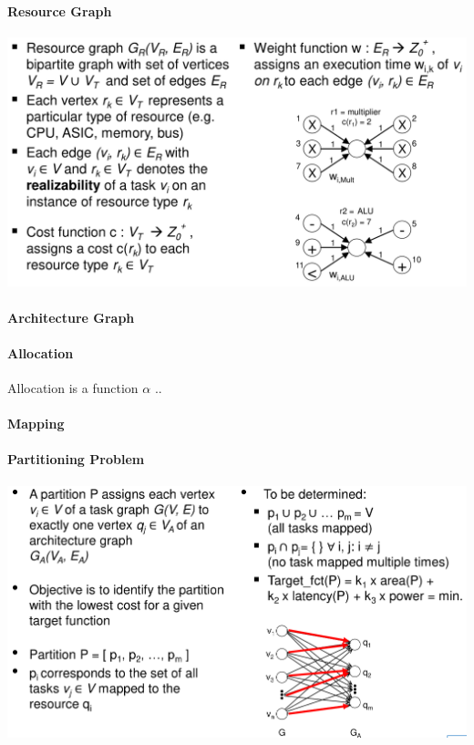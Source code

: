 \documentclass[english]{latex4ei/latex4ei_sheet}
\begin{document}
\paragraph{Resource Graph}

\begin{center}
  \includegraphics[width=\linewidth]{assets/ResourceGraph.png}
  \label{fig:resourcegraph}
\end{center}

\paragraph{Architecture Graph}

\paragraph{Allocation} Allocation is a function $\alpha$ ..

\paragraph{Mapping}

\paragraph{Partitioning Problem}

\begin{center}
  \centering
  \includegraphics[width=\linewidth]{assets/PartitioningProblem.png}
  \label{fig:partitioningproblem}
\end{center}
\end{document}
